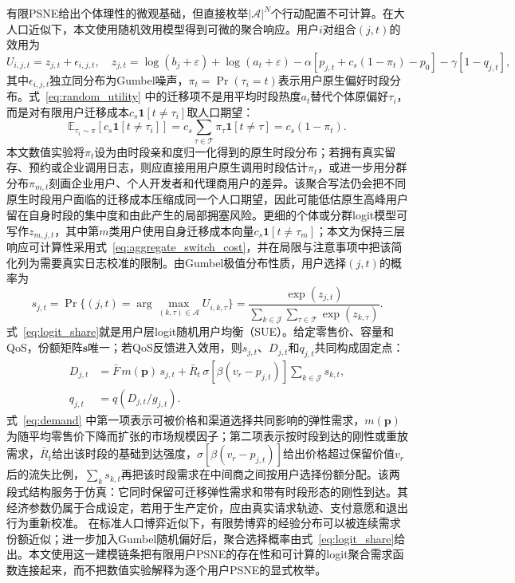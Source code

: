 \documentclass[UTF8,11pt]{ctexart}
\newcommand{\qos}{q}
\newcommand{\T}{\mathcal{T}}
\newcommand{\J}{\mathcal{J}}
\newcommand{\A}{\mathcal{A}}
\newcommand{\D}{D}
\newcommand{\p}{\boldsymbol{p}}
\begin{document}
有限PSNE给出个体理性的微观基础，但直接枚举$|\A|^N$个行动配置不可计算。在大人口近似下，本文使用随机效用模型得到可微的聚合响应。用户$i$对组合$(j,t)$的效用为
\begin{equation}
  U_{i,j,t}=z_{j,t}+\epsilon_{i,j,t},
  \quad
  z_{j,t}=\log(b_j+\varepsilon)+\log(a_t+\varepsilon)
  -\alpha\left[p_{j,t}+c_s(1-\pi_t)-p_0\right]
  -\gamma[1-q_{j,t}],
  \label{eq:random_utility}
\end{equation}
其中$\epsilon_{i,j,t}$独立同分布为Gumbel噪声，$\pi_t=\Pr(\tau_i=t)$表示用户原生偏好时段分布。式~\eqref{eq:random_utility} 中的迁移项不是用平均时段热度$a_t$替代个体原偏好$\tau_i$，而是对有限用户迁移成本$c_s\mathbf{1}[t\ne\tau_i]$取人口期望：
\begin{equation}
  \mathbb{E}_{\tau_i\sim\pi}\!\left[c_s\mathbf{1}[t\ne\tau_i]\right]
  =c_s\sum_{\tau\in\T}\pi_\tau\mathbf{1}[t\ne\tau]
  =c_s(1-\pi_t).
  \label{eq:aggregate_switch_cost}
\end{equation}
本文数值实验将$\pi_t$设为由时段亲和度归一化得到的原生时段分布；若拥有真实留存、预约或企业调用日志，则应直接用用户原生调用时段估计$\pi_t$，或进一步用分群分布$\pi_{m,t}$刻画企业用户、个人开发者和代理商用户的差异。该聚合写法仍会把不同原生时段用户面临的迁移成本压缩成同一个人口期望，因此可能低估原生高峰用户留在自身时段的集中度和由此产生的局部拥塞风险。更细的个体或分群logit模型可写作$z_{m,j,t}$，其中第$m$类用户使用自身迁移成本向量$c_s\mathbf{1}[t\ne\tau_m]$；本文为保持三层响应可计算性采用式~\eqref{eq:aggregate_switch_cost}，并在局限与注意事项中把该简化列为需要真实日志校准的限制。由Gumbel极值分布性质，用户选择$(j,t)$的概率为
\begin{equation}
  s_{j,t}=\Pr\{(j,t)=\arg\max_{(k,\tau)\in\A}U_{i,k,\tau}\}
  =\frac{\exp(z_{j,t})}{\sum_{k\in\J}\sum_{\tau\in\T}\exp(z_{k,\tau})}.
  \label{eq:logit_share}
\end{equation}
式~\eqref{eq:logit_share}就是用户层logit随机用户均衡（SUE）。给定零售价、容量和QoS，份额矩阵$\boldsymbol{s}$唯一；若QoS反馈进入效用，则$s_{j,t}$、$\D_{j,t}$和$q_{j,t}$共同构成固定点：
\begin{align}
  \D_{j,t}&=\bar F\,m(\p)\,s_{j,t}
  +\bar R_t\,\sigma[\beta(v_r-p_{j,t})]\sum_{k\in\J}s_{k,t}, \label{eq:demand}\\
  q_{j,t}&=\qos(\D_{j,t}/g_{j,t}). \label{eq:qos_fixed}
\end{align}
式~\eqref{eq:demand} 中第一项表示可被价格和渠道选择共同影响的弹性需求，$m(\p)$为随平均零售价下降而扩张的市场规模因子；第二项表示按时段到达的刚性或重放需求，$\bar R_t$给出该时段的基础到达强度，$\sigma[\beta(v_r-p_{j,t})]$给出价格超过保留价值$v_r$后的流失比例，$\sum_k s_{k,t}$再把该时段需求在中间商之间按用户选择份额分配。该两段式结构服务于仿真：它同时保留可迁移弹性需求和带有时段形态的刚性到达。其经济参数仍属于合成设定，若用于生产定价，应由真实请求轨迹、支付意愿和退出行为重新校准。
在标准人口博弈近似下，有限势博弈的经验分布可以被连续需求份额近似；进一步加入Gumbel随机偏好后，聚合选择概率由式~\eqref{eq:logit_share}给出。本文使用这一建模链条把有限用户PSNE的存在性和可计算的logit聚合需求函数连接起来，而不把数值实验解释为逐个用户PSNE的显式枚举。
\end{document}
